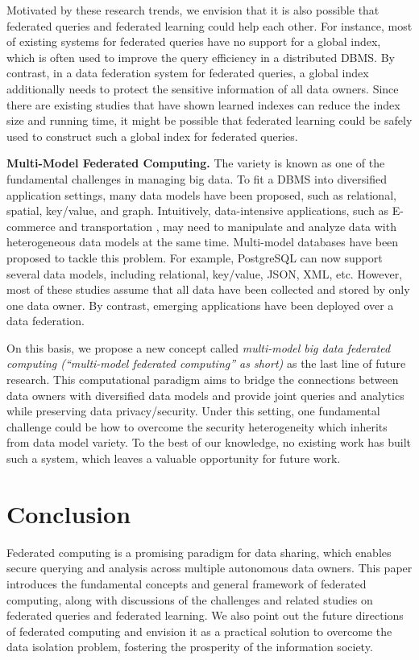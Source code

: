 \documentclass[11pt]{article}
\newcommand{\etc}{etc.\xspace}
\newcommand{\fakeparagraph}[1]{\vspace{1mm}\noindent\textbf{#1.}}
\begin{document}
Motivated by these research trends, we envision that it is also possible that federated queries and federated learning could help each other.
For instance, most of existing systems for federated queries have no support for a global index, which is often used to improve the query efficiency in a distributed DBMS.
By contrast, in a data federation system for federated queries, a global index additionally needs to protect the sensitive information of all data owners.
Since there are existing studies that have shown learned indexes can reduce the index size and running time,
it might be possible that federated learning could be safely used to construct such a global index for federated queries.

\fakeparagraph{Multi-Model Federated Computing}
The variety is known as one of the fundamental challenges in managing big data.
To fit a DBMS into diversified application settings, many data models have been proposed, such as relational, spatial, key/value, and graph.
Intuitively, data-intensive applications, such as E-commerce \cite{Yongxin-DBLP:journals/csur/LuH19} and transportation \cite{Yongxin-DBLP:conf/cikm/LuHC18}, may need to manipulate and analyze data with heterogeneous data models at the same time.
Multi-model databases \cite{Yongxin-DBLP:journals/csur/LuH19} have been proposed to tackle this problem.
For example, PostgreSQL can now support several data models, including relational, key/value, JSON, XML, \etc
However, most of these studies assume that all data have been collected and stored by only one data owner.
By contrast, emerging applications have been deployed over a data federation.

On this basis, we propose a new concept called \textit{multi-model big data federated computing (``multi-model federated computing'' as short)} as the last line of future research. This computational paradigm aims to bridge the connections between data owners with diversified data models and provide joint queries and analytics while preserving data privacy/security. Under this setting, one fundamental challenge could be how to overcome the security heterogeneity \cite{Yongxin-DBLP:conf/sigmod/0012FWY20} which inherits from data model variety. To the best of our knowledge, no existing work has built such a system, which leaves a valuable opportunity for future work.

\section{Conclusion}\label{sec:conclusion}
Federated computing is a promising paradigm for data sharing, which enables secure querying and analysis across multiple autonomous data owners.
This paper introduces the fundamental concepts and general framework of federated computing, along with discussions of the challenges and related studies on federated queries and federated learning.
We also point out the future directions of federated computing and envision it as a practical solution to overcome the data isolation problem, fostering the prosperity of the information society.
\end{document}

